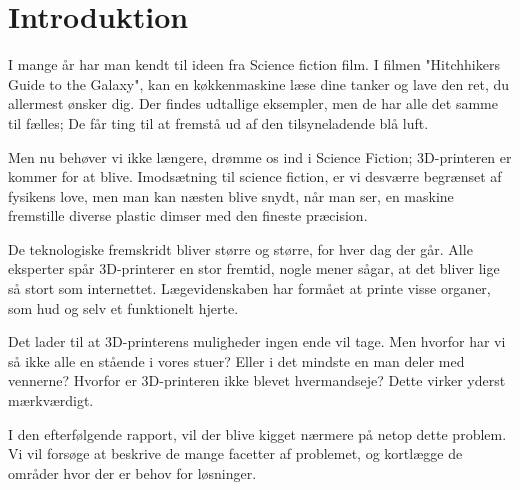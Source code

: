 \chapter{Introduktion} %
\label{cha:introduktion}

I mange år har man kendt til ideen fra Science fiction film. I filmen "Hitchhikers Guide to the Galaxy", kan en køkkenmaskine læse dine tanker og lave den ret, du allermest ønsker dig. Der findes udtallige eksempler, men de har alle det samme til fælles; De får ting til at fremstå ud af den tilsyneladende blå luft.

Men nu behøver vi ikke længere, drømme os ind i Science Fiction; 3D-printeren er kommer for at blive. Imodsætning til science fiction, er vi desværre begrænset af fysikens love, men man kan næsten blive snydt, når man ser, en maskine fremstille diverse plastic dimser med den fineste præcision.

De teknologiske fremskridt bliver større og større, for hver dag der går. Alle eksperter spår 3D-printerer en stor fremtid, nogle mener sågar, at det bliver lige så stort som internettet. Lægevidenskaben har formået at printe visse organer, som hud og selv et funktionelt hjerte.

Det lader til at 3D-printerens muligheder ingen ende vil tage. Men hvorfor har vi så ikke alle en stående i vores stuer? Eller i det mindste en man deler med vennerne? Hvorfor er 3D-printeren ikke blevet hvermandseje? Dette virker yderst mærkværdigt. 

I den efterfølgende rapport, vil der blive kigget nærmere på netop dette problem. Vi vil forsøge at beskrive de mange facetter af problemet, og kortlægge de områder hvor der er behov for løsninger.

